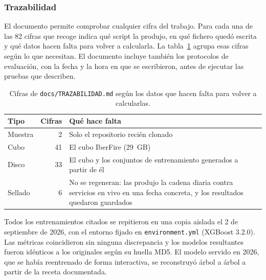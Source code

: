 \documentclass[10pt,a4paper]{article}
\begin{document}

\subsubsection{Trazabilidad}
\label{an:b5-trazabilidad}

El documento
 permite comprobar
cualquier cifra del trabajo. Para cada una de las 82 cifras que recoge indica
qué script la produjo, en qué fichero quedó escrita y qué datos hacen falta para
volver a calcularla. La tabla~\ref{tab:trazabilidad} agrupa esas cifras según
lo que necesitan. El documento incluye también los protocolos de evaluación,
con la fecha y la hora en que se escribieron, antes de ejecutar las pruebas
que describen.

\begin{table}[H]
  \centering
  \caption{Cifras de \texttt{docs/TRAZABILIDAD.md} según los datos que hacen falta
  para volver a calcularlas.}
  \label{tab:trazabilidad}
  \footnotesize
  \begin{tabular}{@{}lr>{\raggedright\arraybackslash}p{12.2cm}@{}}
    \toprule
    Tipo & Cifras & Qué hace falta \\
    \midrule
    Muestra & 2 & Solo el repositorio recién clonado \\
    Cubo & 41 & El cubo IberFire (29~GB) \\
    Disco & 33 & El cubo y los conjuntos de entrenamiento generados a partir de él \\
    Sellado & 6 & No se regeneran: las produjo la cadena diaria contra servicios en vivo en una fecha concreta, y los resultados quedaron guardados \\
    \bottomrule
  \end{tabular}
\end{table}

Todos los entrenamientos citados se repitieron en una copia aislada el 2 de
septiembre de 2026, con el entorno fijado en \texttt{environment.yml} (XGBoost
3.2.0). Las métricas coincidieron sin ninguna discrepancia y los modelos
resultantes fueron idénticos a los originales según su huella MD5. El modelo
servido en 2026, que se había reentrenado de forma interactiva, se reconstruyó
árbol a árbol a partir de la receta documentada.


\end{document}
